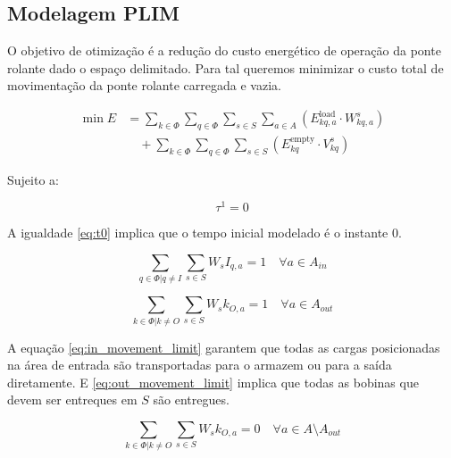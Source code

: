 \documentclass[journal]{IEEEtran}
\begin{document}
        \subsection{Modelagem PLIM}

        O objetivo de otimização é a redução do custo energético de operação da 
        ponte rolante dado o espaço delimitado. Para tal queremos minimizar o 
        custo total de movimentação da ponte rolante carregada e vazia.

        \begin{align*}
            \min E &= \sum_{k \in \Phi} \sum_{q \in \Phi} \sum_{s \in S} \sum_{a \in A} 
                    \left( E_{kq,a}^{\text{load}} \cdot W_{kq,a}^s \right) \\
                &\quad + \sum_{k \in \Phi} \sum_{q \in \Phi} \sum_{s \in S} 
                    \left( E_{kq}^{\text{empty}} \cdot V_{kq}^s \right)
            \label{eq:objetivo}
        \end{align*}


        Sujeito a:

        \begin{equation}
            \tau^{1} = 0
            \label{eq:t0}
        \end{equation}

        A igualdade \ref{eq:t0} implica que o tempo inicial modelado é o instante 0.

        \begin{equation}
            \sum_{q \in \Phi | q \neq I} \sum_{s \in S} W_s I_{q,a} = 1 \quad \forall a \in A_{in} 
            \label{eq:in_movement_limit}
        \end{equation}

        \begin{equation}
        \sum_{k \in \Phi | k \neq O} \sum_{s \in S} W_s k_{O,a} = 1 \quad \forall a \in A_{out}
        \label{eq:out_movement_limit}
        \end{equation}

        A equação \ref{eq:in_movement_limit} 
        garantem que todas as cargas posicionadas na área de entrada são transportadas
        para o armazem ou para a saída diretamente. E  \ref{eq:out_movement_limit} 
        implica que todas as bobinas que devem ser entreques em $S$ são entregues.


        \begin{equation}
            \sum_{k \in \Phi | k \neq O} \sum_{s \in S} W_s k_{O,a} = 0 \quad \forall a \in A \setminus A_{out} 
            \label{eq:storage_requirement}
        \end{equation}
\end{document}
